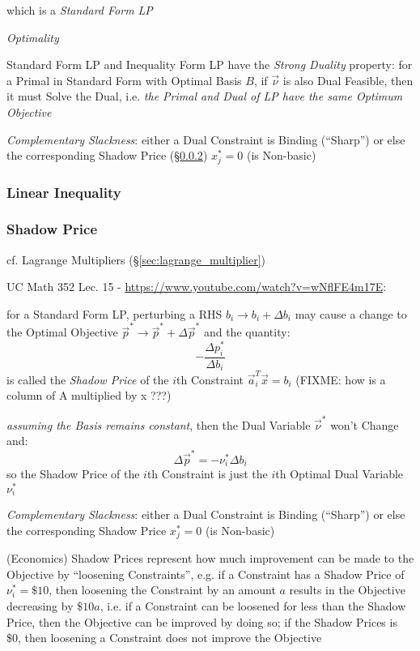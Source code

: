 which is a \emph{Standard Form LP}


\emph{Optimality}

Standard Form LP and Inequality Form LP have the \emph{Strong Duality}
property: for a Primal in Standard Form with Optimal Basis $B$, if $\vec{\nu}$
is also Dual Feasible, then it must Solve the Dual, i.e. \emph{the Primal and
  Dual of LP have the same Optimum Objective}


\emph{Complementary Slackness}: either a Dual Constraint is Binding (``Sharp'')
or else the corresponding Shadow Price (\S\ref{sec:shadow_price}) $x_j^* = 0$
(is Non-basic)



\subsubsection{Linear Inequality}\label{sec:linear_inequality}

\subsubsection{Shadow Price}\label{sec:shadow_price}

cf. Lagrange Multipliers (\S\ref{sec:lagrange_multiplier})

UC Math 352 Lec. 15 - \url{https://www.youtube.com/watch?v=wNflFE4m17E}:

for a Standard Form LP, perturbing a RHS $b_i \rightarrow b_i + \Delta{b_i}$
may cause a change to the Optimal Objective
$\vec{p}^* \rightarrow \vec{p}^* + \Delta{\vec{p}^*}$ and the quantity:
\[
  -\frac{\Delta p_i^*}{\Delta b_i}
\]
is called the \emph{Shadow Price} of the $i$th Constraint $\vec{a}_i^T\vec{x} =
b_i$
(FIXME: how is a column of A multiplied by x ???)

\emph{assuming the Basis remains constant}, then the Dual Variable
$\vec{\nu}^*$ won't Change and:
\[
  \Delta \vec{p}^* = - \nu_i^* \Delta b_i
\]
so the Shadow Price of the $i$th Constraint is just the $i$th Optimal Dual
Variable $\nu_i^*$

\emph{Complementary Slackness}: either a Dual Constraint is Binding (``Sharp'')
or else the corresponding Shadow Price $x_j^* = 0$ (is Non-basic)

(Economics) Shadow Prices represent how much improvement can be made to the
Objective by ``loosening Constraints'', e.g. if a Constraint has a Shadow Price
of $\nu_i^* = \$10$, then loosening the Constraint by an amount $a$ results in
the Objective decreasing by $\$10 a$, i.e. if a Constraint can be loosened for
less than the Shadow Price, then the Objective can be improved by doing so; if
the Shadow Prices is \$0, then loosening a Constraint does not improve the
Objective

